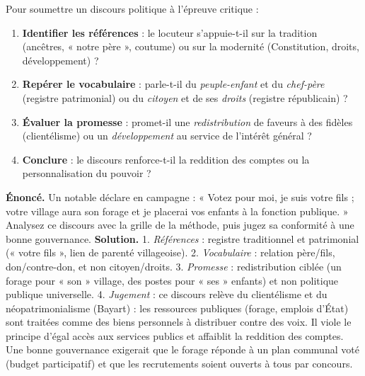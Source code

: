 \documentclass[11pt]{article}
\newcommand{\cle}[1]{{\popxbold\color{popdark}#1}}
\begin{document}
\begin{methode}
Pour soumettre un discours politique à l'épreuve critique :
\begin{enumerate}
\item \textbf{Identifier les références} : le locuteur s'appuie-t-il sur la tradition (ancêtres, « notre père », coutume) ou sur la modernité (Constitution, droits, développement) ?
\item \textbf{Repérer le vocabulaire} : parle-t-il du \emph{peuple-enfant} et du \emph{chef-père} (registre patrimonial) ou du \emph{citoyen} et de ses \emph{droits} (registre républicain) ?
\item \textbf{Évaluer la promesse} : promet-il une \emph{redistribution} de faveurs à des fidèles (clientélisme) ou un \emph{développement} au service de l'intérêt général ?
\item \textbf{Conclure} : le discours renforce-t-il la reddition des comptes ou la personnalisation du pouvoir ?
\end{enumerate}
\end{methode}

\begin{exoresolu}
\textbf{Énoncé.} Un notable déclare en campagne : « Votez pour moi, je suis votre fils ; votre village aura son forage et je placerai vos enfants à la fonction publique. » Analysez ce discours avec la grille de la méthode, puis jugez sa conformité à une bonne gouvernance.
\tcblower
\textbf{Solution.}
1. \emph{Références} : registre traditionnel et patrimonial (« votre fils », lien de parenté villageoise).
2. \emph{Vocabulaire} : relation père/fils, don/contre-don, et non citoyen/droits.
3. \emph{Promesse} : redistribution ciblée (un forage pour « son » village, des postes pour « ses » enfants) et non politique publique universelle.
4. \emph{Jugement} : ce discours relève du \cle{clientélisme} et du \cle{néopatrimonialisme} (Bayart) : les ressources publiques (forage, emplois d'État) sont traitées comme des biens personnels à distribuer contre des voix. Il viole le principe d'égal accès aux services publics et affaiblit la reddition des comptes. Une bonne gouvernance exigerait que le forage réponde à un plan communal voté (budget participatif) et que les recrutements soient ouverts à tous par concours.
\end{exoresolu}
\end{document}
